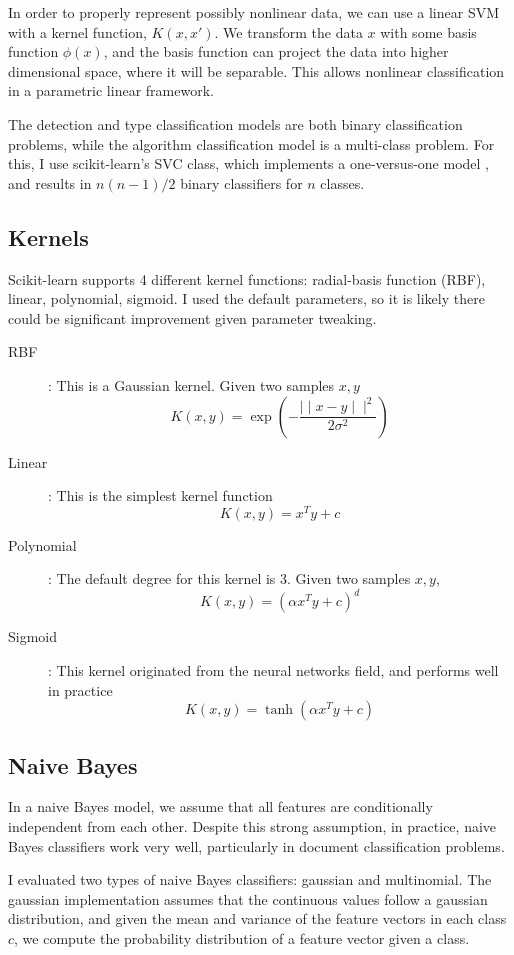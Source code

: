 In order to properly represent possibly nonlinear data, we can use a linear SVM with a kernel function, $K(x, x')$.  We transform the data $x$ with some basis function $\phi(x)$, and the basis function can project the data into higher dimensional space, where it will be separable.  This allows nonlinear classification in a parametric linear framework.

The detection and type classification models are both binary classification problems, while the algorithm classification model is a multi-class problem.  For this, I use scikit-learn's SVC class, which implements a one-versus-one model \cite{knerr}, and results in $n (n-1)/2$ binary classifiers for $n$ classes.

\subsection{Kernels}
Scikit-learn supports 4 different kernel functions: radial-basis function (RBF), linear, polynomial, sigmoid.  I used the default parameters, so it is likely there could be significant improvement given parameter tweaking.
 
\begin{description}
	\item[RBF]: This is a Gaussian kernel.  Given two samples $x, y$
		$$ K(x, y) = \exp \left( -\frac{\mid \mid x-y \mid \mid^2}{2\sigma^2} \right) $$
	\item[Linear]: This is the simplest kernel function
		$$ K(x, y) = x^Ty + c $$
	\item[Polynomial]: The default degree for this kernel is 3.  Given two samples $x, y$,
		$$ K(x, y) = (\alpha x^Ty +c)^d $$ %
	\item[Sigmoid]: This kernel originated from the neural networks field, and performs well in practice
		$$ K(x, y)= \tanh(\alpha x^T y +c) $$
\end{description}

\subsection{Naive Bayes}
In a naive Bayes model, we assume that all features are conditionally independent from each other.  Despite this strong assumption, in practice, naive Bayes classifiers work very well, particularly in document classification problems.

I evaluated two types of naive Bayes classifiers: gaussian and multinomial.  The gaussian implementation assumes that the continuous values follow a gaussian distribution, and given the mean and variance of the feature vectors in each class $c$, we compute the probability distribution of a feature vector given a class.

